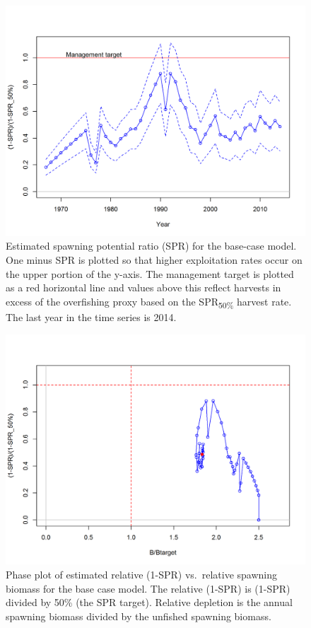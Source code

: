 \documentclass[12pt,]{article}
\begin{document}
\FloatBarrier

\begin{figure}[htbp]
\centering
\includegraphics{r4ss/plots_mod1/SPR3_ratiointerval.png}
\caption{Estimated spawning potential ratio (SPR) for the base-case
model. One minus SPR is plotted so that higher exploitation rates occur
on the upper portion of the y-axis. The management target is plotted as
a red horizontal line and values above this reflect harvests in excess
of the overfishing proxy based on the SPR\textsubscript{50\%} harvest
rate. The last year in the time series is 2014. \label{fig:SPR_all}}
\end{figure}

\begin{figure}[htbp]
\centering
\includegraphics{r4ss/plots_mod1/SPR4_phase.png}
\caption{Phase plot of estimated relative (1-SPR) vs.~relative spawning
biomass for the base case model. The relative (1-SPR) is (1-SPR) divided
by 50\% (the SPR target). Relative depletion is the annual spawning
biomass divided by the unfished spawning biomass. \label{fig:Phase_all}}
\end{figure}
\end{document}
